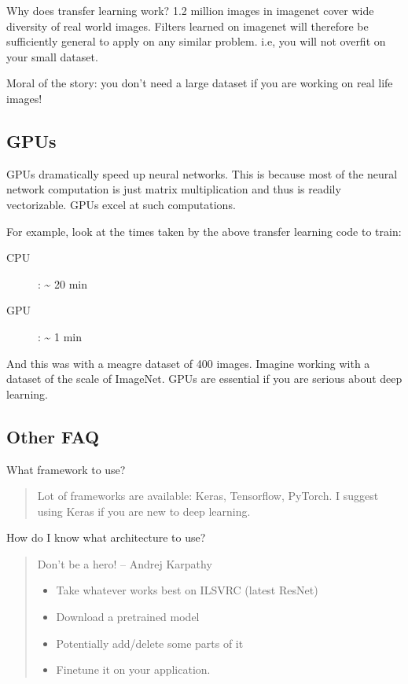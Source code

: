 \documentclass[a4paper]{tufte-handout}
\begin{document}
Why does transfer learning work? 1.2 million images in imagenet cover
wide diversity of real world images. Filters learned on imagenet will
therefore be sufficiently general to apply on any similar problem. i.e,
you will not overfit on your small dataset.

Moral of the story: you don't need a large dataset if you are working on
real life images!

\subsection{GPUs}\label{gpus}

GPUs dramatically speed up neural networks. This is because most of the
neural network computation is just matrix multiplication and thus is
readily vectorizable. GPUs excel at such computations.

For example, look at the times taken by the above transfer learning code to
train:

\begin{description}
\item[CPU]: \textasciitilde{} 20 min
\item[GPU]: \textasciitilde{} 1 min
\end{description}

And this was with a meagre dataset of 400 images. Imagine working with a
dataset of the scale of ImageNet. GPUs are essential if you are serious
about deep learning.

\subsection{Other FAQ}\label{other-faq}

\noindent What framework to use?

\begin{quote}
Lot of frameworks are available: Keras, Tensorflow, PyTorch. I suggest
using Keras if you are new to deep learning.
\end{quote}

\noindent How do I know what architecture to use?

\begin{quote}
Don't be a hero!  -- Andrej Karpathy

\begin{itemize}
\item
  Take whatever works best on ILSVRC (latest ResNet)
\item
  Download a pretrained model
\item
  Potentially add/delete some parts of it
\item
  Finetune it on your application.
\end{itemize}
\end{quote}
\end{document}
